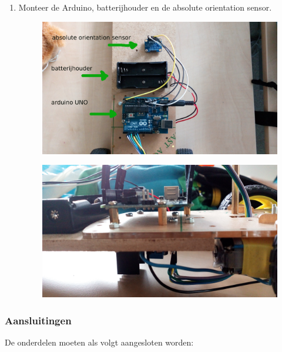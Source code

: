 \documentclass[12pt,a4paper]{article}
\begin{document}
\begin{enumerate}
\begin{figure}[H]
		\label{fig:vastzetten_mc}
	\end{figure}
	\item Monteer de Arduino, batterijhouder en de absolute orientation sensor.
	\begin{figure}[H]
		\centering
		\includegraphics[width=0.7\linewidth]{vastzetten_onderdelen}
		\label{fig:vastzetten_onderdelen}
	\end{figure}
	\begin{figure}[H]
		\centering
		\includegraphics[width=0.7\linewidth]{vastzetten_zijkant}
		\label{fig:vastzetten_zijkant}
	\end{figure}	
\end{enumerate}

\subsubsection{Aansluitingen}
De onderdelen moeten als volgt aangesloten worden:
\end{document}
